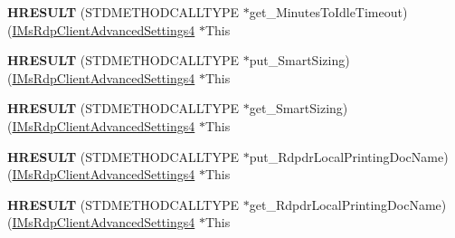 \begin{DoxyCompactItemize}
\item 
\mbox{\label{struct_m_s_t_s_c_lib_1_1_i_ms_rdp_client_advanced_settings4_vtbl_aa5dfb7bf055de491542c07be0e4a63bd}} 
{\bfseries H\+R\+E\+S\+U\+LT} (S\+T\+D\+M\+E\+T\+H\+O\+D\+C\+A\+L\+L\+T\+Y\+PE $\ast$get\+\_\+\+Minutes\+To\+Idle\+Timeout)(\hyperlink{interface_m_s_t_s_c_lib_1_1_i_ms_rdp_client_advanced_settings4}{I\+Ms\+Rdp\+Client\+Advanced\+Settings4} $\ast$This
\item 
\mbox{\label{struct_m_s_t_s_c_lib_1_1_i_ms_rdp_client_advanced_settings4_vtbl_a4d8257257af38c186a7d7062626d7ef4}} 
{\bfseries H\+R\+E\+S\+U\+LT} (S\+T\+D\+M\+E\+T\+H\+O\+D\+C\+A\+L\+L\+T\+Y\+PE $\ast$put\+\_\+\+Smart\+Sizing)(\hyperlink{interface_m_s_t_s_c_lib_1_1_i_ms_rdp_client_advanced_settings4}{I\+Ms\+Rdp\+Client\+Advanced\+Settings4} $\ast$This
\item 
\mbox{\label{struct_m_s_t_s_c_lib_1_1_i_ms_rdp_client_advanced_settings4_vtbl_a3361827456df95eeff35650ec5498af0}} 
{\bfseries H\+R\+E\+S\+U\+LT} (S\+T\+D\+M\+E\+T\+H\+O\+D\+C\+A\+L\+L\+T\+Y\+PE $\ast$get\+\_\+\+Smart\+Sizing)(\hyperlink{interface_m_s_t_s_c_lib_1_1_i_ms_rdp_client_advanced_settings4}{I\+Ms\+Rdp\+Client\+Advanced\+Settings4} $\ast$This
\item 
\mbox{\label{struct_m_s_t_s_c_lib_1_1_i_ms_rdp_client_advanced_settings4_vtbl_a5c427960eadebb1b3bddb62b235e4f65}} 
{\bfseries H\+R\+E\+S\+U\+LT} (S\+T\+D\+M\+E\+T\+H\+O\+D\+C\+A\+L\+L\+T\+Y\+PE $\ast$put\+\_\+\+Rdpdr\+Local\+Printing\+Doc\+Name)(\hyperlink{interface_m_s_t_s_c_lib_1_1_i_ms_rdp_client_advanced_settings4}{I\+Ms\+Rdp\+Client\+Advanced\+Settings4} $\ast$This
\item 
\mbox{\label{struct_m_s_t_s_c_lib_1_1_i_ms_rdp_client_advanced_settings4_vtbl_a1680c72e411e65196b5b7f4b6d19b661}} 
{\bfseries H\+R\+E\+S\+U\+LT} (S\+T\+D\+M\+E\+T\+H\+O\+D\+C\+A\+L\+L\+T\+Y\+PE $\ast$get\+\_\+\+Rdpdr\+Local\+Printing\+Doc\+Name)(\hyperlink{interface_m_s_t_s_c_lib_1_1_i_ms_rdp_client_advanced_settings4}{I\+Ms\+Rdp\+Client\+Advanced\+Settings4} $\ast$This

\end{DoxyCompactItemize}
